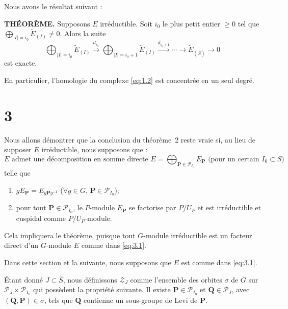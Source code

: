 \documentclass[10pt,a4paper]{article}
\theoremstyle{plain}
\theoremstyle{definition}
\theoremstyle{remark}
\newcommand{\cP}{\mathcal{P}}
\newcommand{\cZ}{\mathcal{Z}}
\newcommand{\bP}{\mathbf{P}}
\newcommand{\bQ}{\mathbf{Q}}
\begin{document}
Nous avons le résultat suivant :

\medskip\noindent\textbf{THÉORÈME.}\quad
Supposons $E$ irréductible. Soit $i_0$ le plus petit entier $\geq 0$ tel que $\bigoplus_{|I|=i_0} \tilde{E}_{(I)} \neq 0$. Alors la suite
\begin{equation}\tag{2.1}\label{eq:2.1}
\bigoplus_{|I|=i_0} \tilde{E}_{(I)} \xrightarrow{d_{i_0}} \bigoplus_{|I|=i_0+1} \tilde{E}_{(I)} \xrightarrow{d_{i_0+1}} \cdots \to \tilde{E}_{(\bar S)} \to 0
\end{equation}
est exacte.

En particulier, l'homologie du complexe \eqref{eq:1.2} est concentrée en un seul degré.

\section*{3}

Nous allons démontrer que la conclusion du théorème~2 reste vraie si, au lieu de supposer $E$ irréductible, nous supposons que :
\begin{equation}\tag{3.1}\label{eq:3.1}
\text{$E$ admet une décomposition en somme directe $E = \bigoplus_{\bP \in \cP_{I_0}} E_{\bP}$ (pour un certain $I_0 \subset \bar S$)}
\end{equation}
telle que

\newpage
\begin{enumerate}[label=(\alph*)]
\item $gE_{\bP} = E_{g\bP g^{-1}}$ ($\forall g \in G$, $\bP \in \cP_{I_0}$);
\item pour tout $\bP \in \cP_{I_0}$, le $P$-module $E_{\bP}$ se factorise par $P/U_P$ et est irréductible et cuspidal comme $P/U_P$-module.
\end{enumerate}
Cela impliquera le théorème, puisque tout $G$-module irréductible est un facteur direct d'un $G$-module $E$ comme dans \eqref{eq:3.1}.

Dans cette section et la suivante, nous supposons que $E$ est comme dans \eqref{eq:3.1}.

Étant donné $J \subset \bar S$, nous définissons $\cZ_J$ comme l'ensemble des orbites $\sigma$ de $G$ sur $\cP_J \times \cP_{I_0}$ qui possèdent la propriété suivante. Il existe $\bP \in \cP_{I_0}$ et $\bQ \in \cP_J$, avec $(\bQ,\bP) \in \sigma$, tels que $\bQ$ contienne un sous-groupe de Levi de $\bP$.
\end{document}
